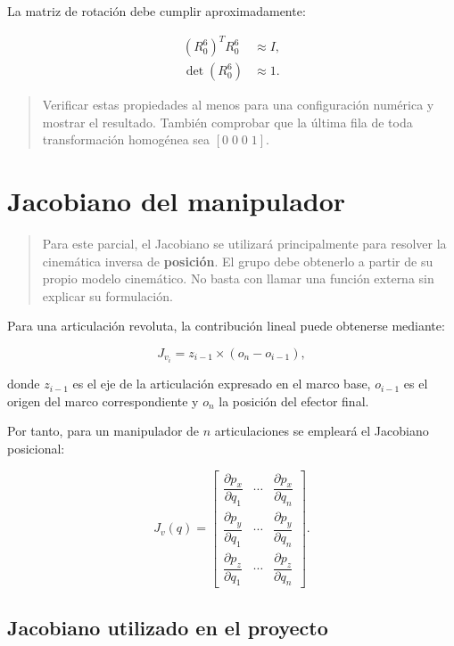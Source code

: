 \documentclass[journal]{IEEEtran}
\newcommand{\instr}[1]{%
\begin{quote}
\small
\noindent\textbf{\color{blue}{INSTRUCCIÓN:}} #1
\end{quote}
}
\begin{document}
La matriz de rotación debe cumplir aproximadamente:

\begin{align}
(R_0^6)^T R_0^6 &\approx I,\\
\det(R_0^6) &\approx 1.
\end{align}

\instr{Verificar estas propiedades al menos para una configuración numérica y mostrar el resultado. También comprobar que la última fila de toda transformación homogénea sea $[0\;0\;0\;1]$.}

\section{Jacobiano del manipulador}

\instr{Para este parcial, el Jacobiano se utilizará principalmente para resolver la cinemática inversa de \textbf{posición}. El grupo debe obtenerlo a partir de su propio modelo cinemático. No basta con llamar una función externa sin explicar su formulación.}

Para una articulación revoluta, la contribución lineal puede obtenerse mediante:

\begin{equation}
J_{v_i} = z_{i-1} \times (o_n-o_{i-1}),
\end{equation}

donde $z_{i-1}$ es el eje de la articulación expresado en el marco base, $o_{i-1}$ es el origen del marco correspondiente y $o_n$ la posición del efector final.

Por tanto, para un manipulador de $n$ articulaciones se empleará el Jacobiano posicional:

\begin{equation}
J_v(q)=
\begin{bmatrix}
\dfrac{\partial p_x}{\partial q_1} & \cdots & \dfrac{\partial p_x}{\partial q_n}\\[6pt]
\dfrac{\partial p_y}{\partial q_1} & \cdots & \dfrac{\partial p_y}{\partial q_n}\\[6pt]
\dfrac{\partial p_z}{\partial q_1} & \cdots & \dfrac{\partial p_z}{\partial q_n}
\end{bmatrix}.
\end{equation}

\subsection{Jacobiano utilizado en el proyecto}
\end{document}
